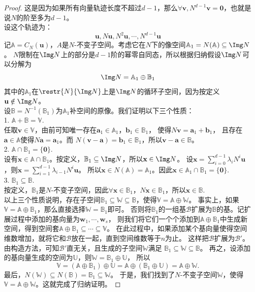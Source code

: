 \documentclass[12pt,UTF8]{ctexbook}
\begin{document}
\begin{appendix}
\begin{proof}
这是因为如果所有向量轨迹长度不超过$d-1$，那么$\forall \mathbf{v}, N^{d-1}\mathbf{v} = \mathbf{0}$，也就是说$N$的阶至多为$d-1$。\\
设这个轨迹为：
$$ \mathbf{u}, N\mathbf{u}, N^2 \mathbf{u}, \cdots , N^{d - 1} \mathbf{u}$$
记$\mathbb{A} = C_N(\mathbf{u})$，$A$是$N$-不变子空间。考虑它在$N$下的像空间$\mathbb{A}_1 = N(\mathbb{A}) \subseteq \Img N$。
$N$限制在$\Img N$上的部分是$d-1$阶的幂零自同态，所以根据归纳假设$\Img N$可以分解为
$$ \Img N = \mathbb{A}_1 \oplus \mathbb{B}_1 $$
其中的$\mathbb{A}_1$在$\restr{N}{\Img N}$上是$\Img N$的循环子空间，因为按定义$\mathbf{u}\notin \Img N$。\\
设$\mathbb{B} = N^{-1}(\mathbb{B}_1)$为$\mathbb{A}_1$补空间的原像。我们证明以下三个性质：\\
1. $\mathbb{A} + \mathbb{B} = \mathbb{V}.$\\
任取$\mathbf{v} \in \mathbb{V}$，由前可知唯一存在$\mathbf{a}_1\in\mathbb{A}_1$，$\mathbf{b}_1\in\mathbb{B}_1$，
使得$N\mathbf{v} = \mathbf{a}_1 + \mathbf{b}_1$，
且存在$\mathbf{a}\in\mathbb{A}$使得$N\mathbf{a} = \mathbf{a}_1$。而
$N(\mathbf{v} - \mathbf{a}) = \mathbf{b}_1\in\mathbb{B}_1$，所以$\mathbf{v} - \mathbf{a} \in \mathbb{B}$。\\
2. $\mathbb{A} \cap \mathbb{B}_1 = \{\mathbf{0}\}.$\\
设有$\mathbf{x} \in \mathbb{A} \cap \mathbb{B}_1$。按定义，$\mathbb{B}_1 \subseteq \Img N$，所以$\mathbf{x} \in \Img N$。
设$\mathbf{x} = \sum_{i=0}^{d-1} \lambda_i N^i\mathbf{u}$，则$\mathbf{x} = \sum_{i=1}^{d-1} \lambda_{i-1} N^i\mathbf{u}$。
所以$\mathbf{x} \in N(\mathbb{A}) = \mathbb{A}_1$。因此$\mathbf{x} \in \mathbb{A}_1 \cap \mathbb{B}_1 = \{\mathbf{0}\}.$\\
3. $\mathbb{B}_1 \subseteq \mathbb{B}.$\\
按定义，$\mathbb{B}_1$是$N$-不变子空间，因此$\forall \mathbf{x}\in\mathbb{B}_1$，$N\mathbf{x} \in \mathbb{B}_1$，所以$\mathbf{x}\in\mathbb{B}.$\\
以上三个性质说明，存在子空间$\mathbb{B}_1 \subseteq \mathbb{W} \subseteq \mathbb{B}$，使得$\mathbb{V} = \mathbb{A} \oplus \mathbb{W}$。
事实上，如果$\mathbb{V} = \mathbb{A}\oplus\mathbb{B}_1$，那么直接选择$\mathbb{W} = \mathbb{B}_1$即可。
否则将$\mathbb{B}_1$的一组基$\mathcal{B}$扩展为$\mathbb{B}$的基。记扩展过程中添加的基向量为$\mathbf{w}_1, \cdots, \mathbf{w}_s$，
则我们将它们一个个添加到$\mathbb{A}\oplus\mathbb{B}_1$中生成新空间，得到空间套$\mathbb{A}\oplus\mathbb{B}_1 \subseteq \cdots \subseteq \mathbb{V}$。
在此过程中，如果添加某个基向量使得空间维数增加，就将它和$\mathcal{B}$放在一起，直到空间维数等于$n$为止。
这样把$\mathcal{B}$扩展为$\mathcal{B}'$。由构造方法，可知$\mathcal{B}'$直无关，且生成的子空间$\mathbb{W}$满足
$\mathbb{B}_1 \subseteq \mathbb{W} \subseteq \mathbb{B}$。
再之，设添加的基向量生成的空间为$\mathbb{U}$，则$\mathbb{W} = \mathbb{B}_1 \oplus \mathbb{U}$，
所以
$$\mathbb{V} = (\mathbb{A}\oplus\mathbb{B}_1)\oplus \mathbb{U} = \mathbb{A}\oplus(\mathbb{B}_1\oplus \mathbb{U}) = \mathbb{A} \oplus \mathbb{W}.$$
最后，$N(\mathbb{W}) \subseteq N(\mathbb{B}) = \mathbb{B}_1 \subseteq \mathbb{W}$。
于是，我们找到了$N$-不变子空间$\mathbb{W}$，使得$\mathbb{V} = \mathbb{A} \oplus \mathbb{W}$。这就完成了归纳证明。


\end{proof}
\end{appendix}
\end{document}
